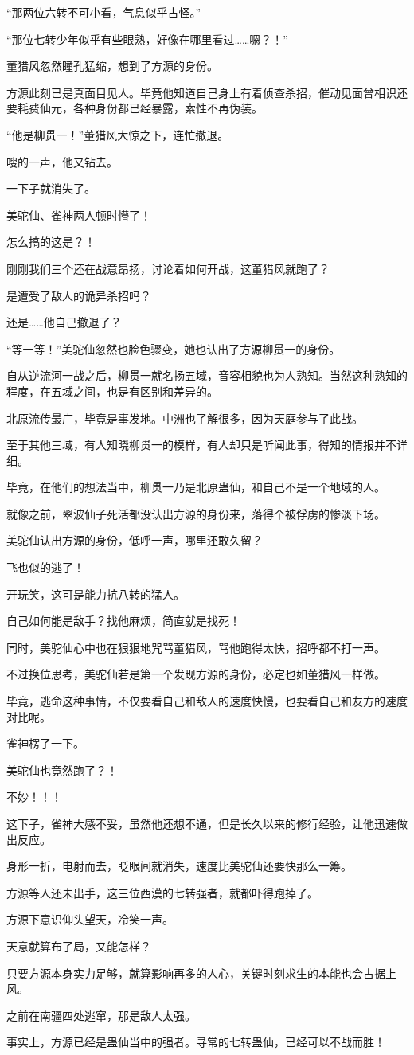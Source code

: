 \begin{this_body}
“那两位六转不可小看，气息似乎古怪。”

“那位七转少年似乎有些眼熟，好像在哪里看过……嗯？！”

董猎风忽然瞳孔猛缩，想到了方源的身份。

方源此刻已是真面目见人。毕竟他知道自己身上有着侦查杀招，催动见面曾相识还要耗费仙元，各种身份都已经暴露，索性不再伪装。

“他是柳贯一！”董猎风大惊之下，连忙撤退。

嗖的一声，他又钻去。

一下子就消失了。

美驼仙、雀神两人顿时懵了！

怎么搞的这是？！

刚刚我们三个还在战意昂扬，讨论着如何开战，这董猎风就跑了？

是遭受了敌人的诡异杀招吗？

还是……他自己撤退了？

“等一等！”美驼仙忽然也脸色骤变，她也认出了方源柳贯一的身份。

自从逆流河一战之后，柳贯一就名扬五域，音容相貌也为人熟知。当然这种熟知的程度，在五域之间，也是有区别和差异的。

北原流传最广，毕竟是事发地。中洲也了解很多，因为天庭参与了此战。

至于其他三域，有人知晓柳贯一的模样，有人却只是听闻此事，得知的情报并不详细。

毕竟，在他们的想法当中，柳贯一乃是北原蛊仙，和自己不是一个地域的人。

就像之前，翠波仙子死活都没认出方源的身份来，落得个被俘虏的惨淡下场。

美驼仙认出方源的身份，低呼一声，哪里还敢久留？

飞也似的逃了！

开玩笑，这可是能力抗八转的猛人。

自己如何能是敌手？找他麻烦，简直就是找死！

同时，美驼仙心中也在狠狠地咒骂董猎风，骂他跑得太快，招呼都不打一声。

不过换位思考，美驼仙若是第一个发现方源的身份，必定也如董猎风一样做。

毕竟，逃命这种事情，不仅要看自己和敌人的速度快慢，也要看自己和友方的速度对比呢。

雀神楞了一下。

美驼仙也竟然跑了？！

不妙！！！

这下子，雀神大感不妥，虽然他还想不通，但是长久以来的修行经验，让他迅速做出反应。

身形一折，电射而去，眨眼间就消失，速度比美驼仙还要快那么一筹。

方源等人还未出手，这三位西漠的七转强者，就都吓得跑掉了。

方源下意识仰头望天，冷笑一声。

天意就算布了局，又能怎样？

只要方源本身实力足够，就算影响再多的人心，关键时刻求生的本能也会占据上风。

之前在南疆四处逃窜，那是敌人太强。

事实上，方源已经是蛊仙当中的强者。寻常的七转蛊仙，已经可以不战而胜！

\end{this_body}

